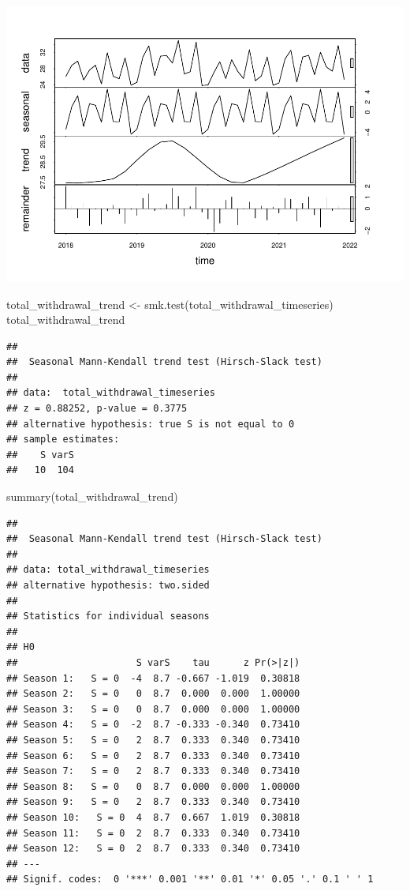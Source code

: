 \documentclass[
  12pt,
]{article}
\newenvironment{Shaded}{\begin{snugshade}}{\end{snugshade}}
\newcommand{\FunctionTok}[1]{\textcolor[rgb]{0.00,0.00,0.00}{#1}}
\newcommand{\NormalTok}[1]{#1}
\newcommand{\OtherTok}[1]{\textcolor[rgb]{0.56,0.35,0.01}{#1}}
\begin{document}
\includegraphics{Project_files/figure-latex/time-series analysis on withdrawals-1.pdf}

\begin{Shaded}
\begin{Highlighting}[]
\NormalTok{total\_withdrawal\_trend }\OtherTok{\textless{}{-}} \FunctionTok{smk.test}\NormalTok{(total\_withdrawal\_timeseries)}
\NormalTok{total\_withdrawal\_trend}
\end{Highlighting}
\end{Shaded}

\begin{verbatim}
## 
##  Seasonal Mann-Kendall trend test (Hirsch-Slack test)
## 
## data:  total_withdrawal_timeseries
## z = 0.88252, p-value = 0.3775
## alternative hypothesis: true S is not equal to 0
## sample estimates:
##    S varS 
##   10  104
\end{verbatim}

\begin{Shaded}
\begin{Highlighting}[]
\FunctionTok{summary}\NormalTok{(total\_withdrawal\_trend)}
\end{Highlighting}
\end{Shaded}

\begin{verbatim}
## 
##  Seasonal Mann-Kendall trend test (Hirsch-Slack test)
## 
## data: total_withdrawal_timeseries
## alternative hypothesis: two.sided
## 
## Statistics for individual seasons
## 
## H0
##                     S varS    tau      z Pr(>|z|)  
## Season 1:   S = 0  -4  8.7 -0.667 -1.019  0.30818  
## Season 2:   S = 0   0  8.7  0.000  0.000  1.00000  
## Season 3:   S = 0   0  8.7  0.000  0.000  1.00000  
## Season 4:   S = 0  -2  8.7 -0.333 -0.340  0.73410  
## Season 5:   S = 0   2  8.7  0.333  0.340  0.73410  
## Season 6:   S = 0   2  8.7  0.333  0.340  0.73410  
## Season 7:   S = 0   2  8.7  0.333  0.340  0.73410  
## Season 8:   S = 0   0  8.7  0.000  0.000  1.00000  
## Season 9:   S = 0   2  8.7  0.333  0.340  0.73410  
## Season 10:   S = 0  4  8.7  0.667  1.019  0.30818  
## Season 11:   S = 0  2  8.7  0.333  0.340  0.73410  
## Season 12:   S = 0  2  8.7  0.333  0.340  0.73410  
## ---
## Signif. codes:  0 '***' 0.001 '**' 0.01 '*' 0.05 '.' 0.1 ' ' 1
\end{verbatim}
\end{document}
